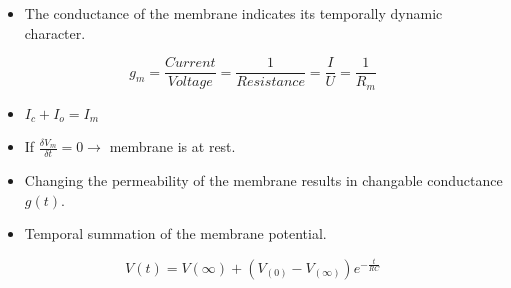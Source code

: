 \documentclass[english,11pt]{article}
\begin{document}
\begin{itemize}
\item The conductance of the membrane indicates its temporally dynamic character.
\end{itemize}
\begin{equation}
 g_m = \frac{Current}{Voltage} = \frac{1}{Resistance} = \frac{I}{U} = \frac{1}{R_m}
 \end{equation}
 
 \begin{itemize}
\item $I_c + I_o = I_m$
\item If $\frac{\delta V_m}{\delta t} = 0 \rightarrow$ membrane is at rest.
\item Changing the permeability of the membrane results in changable conductance $g(t)$.
\item Temporal summation of the membrane potential.
\end{itemize}

\begin{equation}
V(t) = V(\infty) + (V_{(0)}-V_{(\infty)}) e^{-\frac{t}{RC}}
\end{equation}


\end{document}
